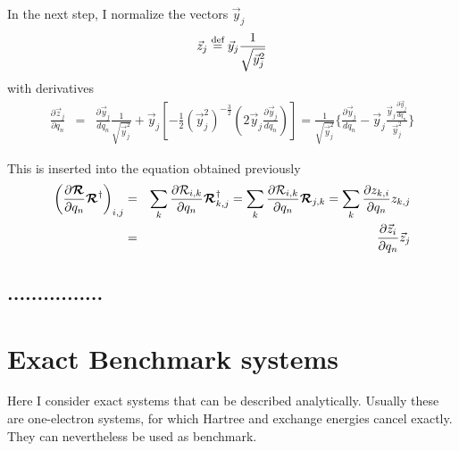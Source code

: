\documentclass[11pt,a4paper]{report}
\begin{document}
In the next step, I normalize the vectors $\vec{y}_j$
\begin{eqnarray}
\vec{z}_j\stackrel{\text{def}}{=}\vec{y}_j\frac{1}{\sqrt{\vec{y}_j^2}}
\end{eqnarray}
with derivatives
\begin{eqnarray}
\frac{\partial\vec{z}_j}{\partial q_n}
&=&
\frac{\partial\vec{y}_j}{dq_n}\frac{1}{\sqrt{\vec{y}_j^2}}
+
\vec{y}_j\left[-\frac{1}{2}(\vec{y}_j^2)^{-\frac{3}{2}}
\left(2\vec{y}_j\frac{\partial\vec{y}_j}{dq_n}\right)\right]
%
%
=
\frac{1}{\sqrt{\vec{y}_j^2}}
\biggl\{
\frac{\partial\vec{y}_j}{dq_n}
-
\vec{y}_j\frac{\vec{y}_j\frac{\partial\vec{y}_j}{dq_n}}{\vec{y}_j^2}
\biggr\}
\end{eqnarray}

This is inserted into the equation obtained previously
\begin{eqnarray}
\left(
\frac{\partial\bm{\mathcal{R}}}{\partial q_n}\bm{\mathcal{R}}^\dagger
\right)_{i,j}
&=&
\sum_k
\frac{\partial\mathcal{R}_{i,k}}{\partial q_n}\bm{\mathcal{R}}^\dagger_{k,j}
=
\sum_k
\frac{\partial\mathcal{R}_{i,k}}{\partial q_n}\bm{\mathcal{R}}_{j,k}
=
\sum_k
\frac{\partial{z}_{k,i}}{\partial q_n}z_{k,j}
\nonumber\\
&=&
\frac{\partial\vec{z}_i}{\partial q_n}\vec{z}_{j}
\nonumber\\
\end{eqnarray}


\section{................}



\appendix
\chapter{Exact Benchmark systems}
Here I consider exact systems that can be described analytically.
Usually these are one-electron systems, for which Hartree and exchange
energies cancel exactly. They can nevertheless be used as benchmark.


\end{document}
